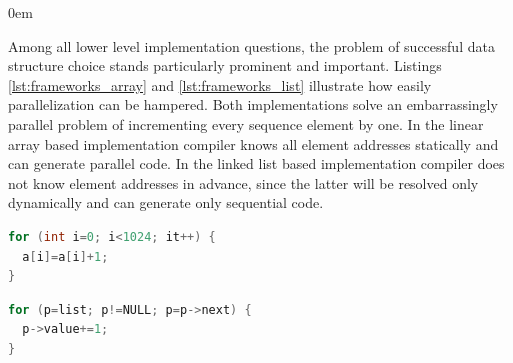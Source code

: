 \begin{description}[style=unboxed,leftmargin=0cm]
\itemsep0em
\item[\textit{The grand problem of Data-Centric Parallelization (DCP)}] Among all lower level implementation questions, the problem of successful data structure choice stands particularly prominent and important. Listings \ref{lst:frameworks_array} and \ref{lst:frameworks_list} illustrate how easily parallelization can be hampered. Both implementations solve an embarrassingly parallel problem of incrementing every sequence element by one. In the linear array based implementation compiler knows all element addresses statically and can generate parallel code. In the linked list based implementation compiler does not know element addresses in advance, since the latter will be resolved only dynamically and can generate only sequential code.\newline\null
\begin{minipage}[t]{0.5\linewidth}
\begin{lstlisting}[caption={\raggedright Parallelizable loop operating on a \textbf{linear array}.},label={lst:frameworks_array},language=C]
for (int i=0; i<1024; it++) {
  a[i]=a[i]+1;
}
\end{lstlisting}
\end{minipage}
%
\begin{minipage}[t]{0.5\linewidth}
\begin{lstlisting}[caption={\raggedright Non-parallelizable loop operating on a \textbf{linked-list}.},label={lst:frameworks_list},language=C]
for (p=list; p!=NULL; p=p->next) {
  p->value+=1;
}
\end{lstlisting}
\end{minipage}


\end{description}
